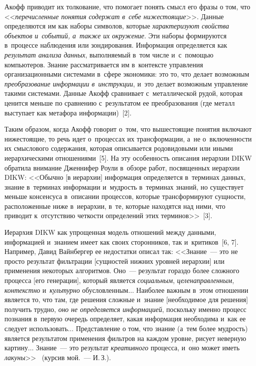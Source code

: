 \begin{multicols}{2}
{}
  
  Акофф приводит их толкование, что помогает понять смысл его фразы о том, 
что <<\textit{пе\-ре\-чис\-лен\-ные понятия содержат в~себе нижестоящие}>>. 
Данные определяются им как наборы символов, которые \textit{характеризуют 
свойства объектов и~событий, а~также их окружение}. Эти наборы 
формируются в~процессе наблюдения или зондирования. Информация 
определяется как \textit{результат анализа данных}, вы\-пол\-ня\-емый в~том чис\-ле 
и~с~по\-мощью компьютеров. Знание рассматривается им в~контексте 
управления организационными системами в~сфере экономики: это то, что 
делает возможным \textit{преобразование информации в~инструкции}, и~это 
делает возможным управ\-ле\-ние такими сис\-те\-ма\-ми. Данные Акофф сравнивает 
с~металлической рудой, которая ценится меньше по сравнению с~результатом 
ее преобразования (где металл выступает как метафора ин\-фор\-ма\-ции)~[2].
{

}
  
  Таким образом, когда Акофф говорит о~том, что вышестоящие понятия 
включают нижестоящие, то речь идет о~процессах их трансформации, а~не 
о~включенности их смыслового содержания, которая описывается 
родовидовыми или иными иерархическими отношениями~[5]. На эту 
особенность описания иерархии DIKW обратила внимание Дженнифер Роули 
в~обзоре работ, посвященных иерархии DIKW: <<Обычно [в иерархии] 
информация определяется в~терминах данных, знание в~терминах информации 
и~мудрость в~терминах знаний, но существует меньше консенсуса в~описании 
процессов, которые трансформируют сущности, расположенные ниже 
в~иерархии, в~те, которые находятся над ними, что приводит к~отсутствию 
чет\-кости определений этих терминов>>~[3].
  
  Иерархия DIKW как упрощенная модель отношений между данными, 
информацией и~знанием имеет как своих сторонников, так и~критиков~[6, 7]. 
Например, Давид Вайнбергер ее недостатки описал так: <<Знание~--- это не 
просто результат фильтрации [сущностей нижних уровней иерархии] или 
применения некоторых алгоритмов. Оно~--- результат гораздо более сложного 
процесса [его генерации], который является \textit{социальным}, 
\textit{целенаправленным}, \textit{контекстно} и~\textit{культурно} 
обусловленным$\ldots$ Наиболее важным в~этом отношении является то, что 
там, где решения сложные и~знание [необходимое для решения] получить 
трудно, \textit{оно не определяется информацией}, поскольку именно процесс 
познания в~первую очередь определяет, какая информация необходима и~как ее 
следует использовать$\ldots$ Представление о том, что знание (а~тем более 
мудрость) является результатом применения фильтров на каж\-дом уровне, 
рисует неверную картину$\ldots$ Знание~--- это результат \textit{креативного} 
процесса, и~оно может иметь \textit{лакуны}>>~\cite{6-zac} (курсив мой.~--- 
И.\,З.).
  

\end{multicols}
